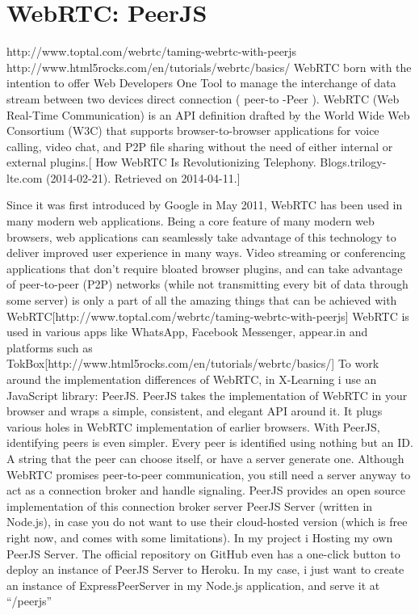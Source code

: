 \newpage
\section{WebRTC: PeerJS}
\label{sec:WebRTC: PeerJS}


http://www.toptal.com/webrtc/taming-webrtc-with-peerjs
http://www.html5rocks.com/en/tutorials/webrtc/basics/
WebRTC born with the intention to offer Web Developers One Tool to manage the interchange of data stream between two devices direct connection ( peer-to -Peer ).
WebRTC (Web Real-Time Communication) is an API definition drafted by the World Wide Web Consortium (W3C) that supports browser-to-browser applications for voice calling, video chat, and P2P file sharing without the need of either internal or external plugins.[ How WebRTC Is Revolutionizing Telephony. Blogs.trilogy-lte.com (2014-02-21). Retrieved on 2014-04-11.]

Since it was first introduced by Google in May 2011, WebRTC has been used in many modern web applications. Being a core feature of many modern web browsers, web applications can seamlessly take advantage of this technology to deliver improved user experience in many ways. Video streaming or conferencing applications that don’t require bloated browser plugins, and can take advantage of peer-to-peer (P2P) networks (while not transmitting every bit of data through some server) is only a part of all the amazing things that can be achieved with WebRTC[http://www.toptal.com/webrtc/taming-webrtc-with-peerjs]
WebRTC is used in various apps like WhatsApp, Facebook Messenger, appear.in and platforms such as TokBox[http://www.html5rocks.com/en/tutorials/webrtc/basics/]
To work around the implementation differences of WebRTC, in X-Learning i use an JavaScript library: PeerJS.
PeerJS takes the implementation of WebRTC in your browser and wraps a simple, consistent, and elegant API around it. It plugs various holes in WebRTC implementation of earlier browsers. 
With PeerJS, identifying peers is even simpler. Every peer is identified using nothing but an ID. A string that the peer can choose itself, or have a server generate one. Although WebRTC promises peer-to-peer communication, you still need a server anyway to act as a connection broker and handle signaling. PeerJS provides an open source implementation of this connection broker server PeerJS Server (written in Node.js), in case you do not want to use their cloud-hosted version (which is free right now, and comes with some limitations).
In my project i Hosting my own PeerJS Server. The official repository on GitHub even has a one-click button to deploy an instance of PeerJS Server to Heroku.
In my case, i just want to create an instance of ExpressPeerServer in my Node.js application, and serve it at “/peerjs”

